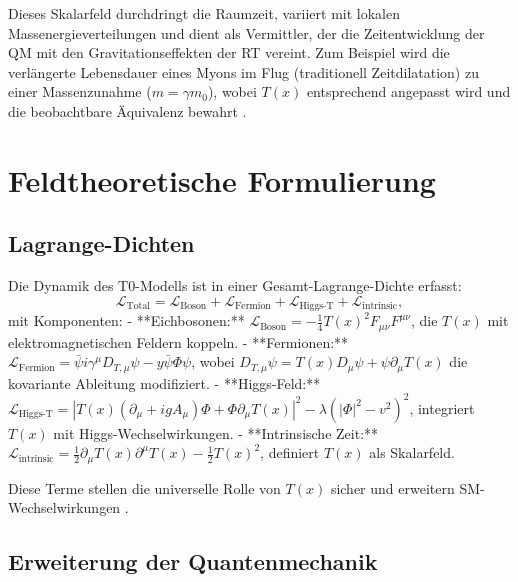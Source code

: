 \documentclass[12pt,a4paper]{article}
\newcommand{\Tfield}{T(x)}
\newcommand{\DhiggsT}{\Tfield (\partial_\mu + ig A_\mu) \Phi + \Phi \partial_\mu \Tfield}
\newcommand{\DTmu}{D_{T,\mu}}
\newcommand{\calL}{\mathcal{L}}
\begin{document}
	Dieses Skalarfeld durchdringt die Raumzeit, variiert mit lokalen Massenergieverteilungen und dient als Vermittler, der die Zeitentwicklung der QM mit den Gravitationseffekten der RT vereint. Zum Beispiel wird die verlängerte Lebensdauer eines Myons im Flug (traditionell Zeitdilatation) zu einer Massenzunahme (\(m = \gamma m_0\)), wobei \(\Tfield\) entsprechend angepasst wird und die beobachtbare Äquivalenz bewahrt \cite{pascher_quantum_2025}.
	
	\section{Feldtheoretische Formulierung}
	\label{sec:field_theory}
	
	\subsection{Lagrange-Dichten}
	\label{subsec:lagrangian}
	
	Die Dynamik des T0-Modells ist in einer Gesamt-Lagrange-Dichte erfasst:
	\begin{equation}
		\calL_{\text{Total}} = \calL_{\text{Boson}} + \calL_{\text{Fermion}} + \calL_{\text{Higgs-T}} + \calL_{\text{intrinsic}},
		\label{eq:total_lagrangian}
	\end{equation}
	mit Komponenten:
	- **Eichbosonen:** \(\calL_{\text{Boson}} = -\frac{1}{4}\Tfield^2 F_{\mu\nu}F^{\mu\nu}\), die \(\Tfield\) mit elektromagnetischen Feldern koppeln.
	- **Fermionen:** \(\calL_{\text{Fermion}} = \bar{\psi}i\gamma^{\mu}\DTmu\psi - y\bar{\psi}\Phi\psi\), wobei \(\DTmu\psi = \Tfield D_{\mu}\psi + \psi\partial_{\mu}\Tfield\) die kovariante Ableitung modifiziert.
	- **Higgs-Feld:** \(\calL_{\text{Higgs-T}} = |\DhiggsT|^2 - \lambda(|\Phi|^2 - v^2)^2\), integriert \(\Tfield\) mit Higgs-Wechselwirkungen.
	- **Intrinsische Zeit:** \(\calL_{\text{intrinsic}} = \frac{1}{2}\partial_{\mu}\Tfield\partial^{\mu}\Tfield - \frac{1}{2}\Tfield^2\), definiert \(\Tfield\) als Skalarfeld.
	
	Diese Terme stellen die universelle Rolle von \(\Tfield\) sicher und erweitern SM-Wechselwirkungen \cite{pascher_lagrange_2025}.
	
	\subsection{Erweiterung der Quantenmechanik}
	\label{subsec:qm_extension}
	
\end{document}
